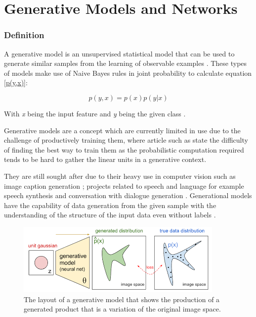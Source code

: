 \chapter{Generative Models and Networks}
\label{ch:Generative Models and Networks}

\subsection{Definition}
A generative model  is an unsupervised statistical model that can be used to generate similar samples from the learning of observable examples \citep{shin:2017}.
These types of models make use of Naive Bayes rules in joint probability to calculate equation \ref{p(y,x)}:

\begin{equation}\label{p(y,x)}
p(y,x) = p(x)p(y|x)
\end{equation}

With \textit{x} being the input feature and \textit{y} being the given class \citet{ng:2002}.

Generative models are a concept which are currently limited in use due to the challenge of productively training them, 
where article such as \cite{goodfellow:2014} state the difficulty of 
finding the best way to train them as the probabilistic computation required tends to be hard to gather the linear units in a generative context.



They are still sought after due to their heavy use in computer vision such as image caption generation \citet{lin:2014,touretzky:1996}; projects related to speech and language for example speech synthesis \citet{ou:2012} and conversation with dialogue generation \citet{sordoni:2015}. Generational models have the capability of data generation from the given sample with the understanding of the structure of the input data even without labels \citet{tu:2007}.


\begin{figure}
  \centering
  \includegraphics[width=1\linewidth]{graphics/generational_models/gm.png}
  \caption{The layout of a generative model that shows the production of a generated product that is a variation of the original image space. }
  \label{fig:GAN}
\end{figure}
\pagebreak
